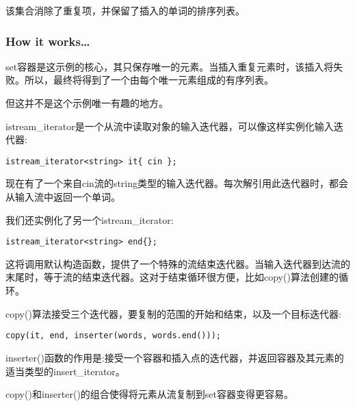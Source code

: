 该集合消除了重复项，并保留了插入的单词的排序列表。

\subsubsection{How it works…}

set容器是这示例的核心，其只保存唯一的元素。当插入重复元素时，该插入将失败。所以，最终将得到了一个由每个唯一元素组成的有序列表。

但这并不是这个示例唯一有趣的地方。

istream\_iterator是一个从流中读取对象的输入迭代器，可以像这样实例化输入迭代器:

\begin{lstlisting}[style=styleCXX]
istream_iterator<string> it{ cin };
\end{lstlisting}

现在有了一个来自cin流的string类型的输入迭代器。每次解引用此迭代器时，都会从输入流中返回一个单词。

我们还实例化了另一个istream\_iterator:

\begin{lstlisting}[style=styleCXX]
istream_iterator<string> end{};
\end{lstlisting}

这将调用默认构造函数，提供了一个特殊的流结束迭代器。当输入迭代器到达流的末尾时，等于流的结束迭代器。这对于结束循环很方便，比如copy()算法创建的循环。

copy()算法接受三个迭代器，要复制的范围的开始和结束，以及一个目标迭代器:

\begin{lstlisting}[style=styleCXX]
copy(it, end, inserter(words, words.end()));
\end{lstlisting}

inserter()函数的作用是:接受一个容器和插入点的迭代器，并返回容器及其元素的适当类型的insert\_iterator。

copy()和inserter()的组合使得将元素从流复制到set容器变得更容易。

